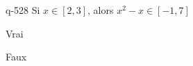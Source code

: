 \begin{truefalse}{q-528}
Si $x\in[2,3]$, alors $x^2-x\in[-1,7]$
\item* Vrai
\item Faux
\end{truefalse}

